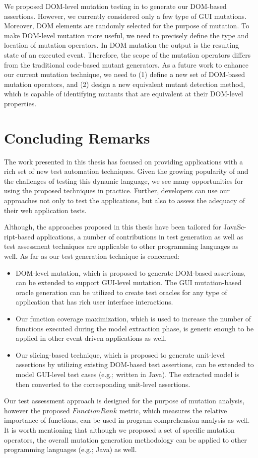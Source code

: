  We proposed DOM-level mutation testing in  to generate our DOM-based assertions. However, we currently considered only a few type of GUI mutations. Moreover, DOM elements are randomly selected for the purpose of mutation. To make DOM-level mutation more useful, we need to precisely define the type and location of mutation operators. 
In DOM mutation the output is the resulting state of an executed event. Therefore, the scope of the mutation operators differs from the traditional code-based mutant generators. As a future work to enhance our current mutation technique, we need to (1) define a new set of DOM-based mutation operators, and (2) design a new equivalent mutant detection method, which is capable of identifying mutants that are equivalent at their DOM-level properties.
\section{Concluding Remarks}
The work presented in this thesis has focused on providing \javascript applications with a rich set of new test automation techniques. Given the growing popularity of \javascript and the challenges of testing this dynamic language, we see many opportunities for using the proposed techniques in practice. Further, developers can use our approaches not only to test the applications, but also to assess the adequacy of their web application tests.

Although, the approaches proposed in this thesis have been tailored for JavaSc-\\ript-based applications, a number of contributions in test generation as well as test assessment techniques are applicable to other programming languages as well. As far as our test generation technique is concerned:
\begin{itemize}
\item DOM-level mutation, which is proposed to generate DOM-based assertions, can be extended to support GUI-level mutation. The GUI mutation-based oracle generation can be utilized to create test oracles for any type of application that has rich user interface interactions. 
\item Our function coverage maximization, which is used to increase the number of functions executed during the model extraction phase, is generic enough to be applied in other event driven applications as well. 
\item Our slicing-based technique, which is proposed to generate unit-level assertions by utilizing existing DOM-based test assertions, can be extended to model GUI-level test cases (e.g.; written in Java). The extracted model is then converted to the corresponding unit-level assertions.
\end{itemize}
Our test assessment approach is designed for the purpose of mutation analysis, however the proposed $FunctionRank$ metric, which measures the relative importance of functions, can be used in program comprehension analysis as well. It is worth mentioning that although we proposed a set of specific \javascript mutation operators, the overall mutation generation methodology can be applied to other programming languages (e.g.; Java) as well.     
  



